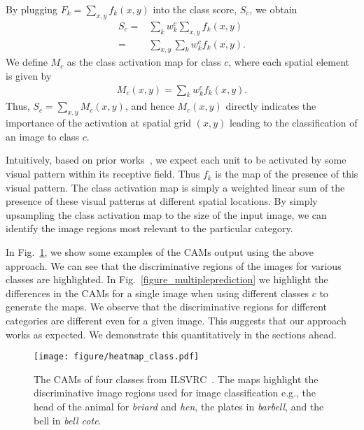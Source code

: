 \documentclass[10pt,twocolumn,letterpaper]{article}
\begin{document}
By plugging $F_{k} = \sum_{x,y}f_{k}(x,y)$ into the class score, $S_c$, we obtain
\begin{align}\label{eq:linearscore}
\nonumber S_c = &\sum_{k}w^{c}_{k}\sum_{x,y}f_{k}(x,y)\\
=&\sum_{x,y}\sum_{k}w^{c}_{k}f_{k}(x,y).
\end{align}
We define $M_{c}$ as the class activation map for class $c$, where each spatial element is given by
\begin{align}
M_{c}(x,y) = \sum_{k}w^{c}_{k}f_{k}(x,y).
\end{align} 
Thus, $S_c =\sum_{x,y}M_{c}(x,y)$, and hence $M_{c}(x,y)$ directly indicates the importance of the activation at spatial grid $(x,y)$ leading to the classification of an image to class $c$.

Intuitively, based on prior works~\cite{zhou2014object,zeiler2014visualizing}, we expect each unit to be activated by some visual pattern within its receptive field. Thus $f_k$ is the map of the presence of this visual pattern. The class activation map is simply a weighted linear sum of the presence of these visual patterns at different spatial locations. By simply upsampling the class activation map to the size of the input image, we can identify the image regions most relevant to the particular category.

In Fig.~\ref{figure_examplemapping}, we show some examples of the CAMs output using the above approach. We can see that the discriminative regions of the images for various classes are highlighted. In Fig.~\ref{figure_multipleprediction} we highlight the differences in the CAMs for a single image when using different classes $c$ to generate the maps. We observe that the discriminative regions for different categories are different even for a given image. This suggests that our approach works as expected. We demonstrate this quantitatively in the sections ahead.







\begin{figure}
\begin{center}
\texttt{[image: figure/heatmap\_class.pdf]}
\end{center}
\vspace*{-4mm}
 \caption{The CAMs of four classes from ILSVRC~\cite{ILSVRCijcv15}. The maps highlight the discriminative image regions used for image classification e.g., the head of the animal for \textit{briard} and \textit{hen}, the plates in \textit{barbell}, and the bell in \textit{bell cote}.}\label{figure_examplemapping}
\end{figure}
\end{document}
